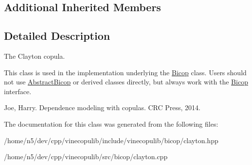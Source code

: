 \subsection*{Additional Inherited Members}


\subsection{Detailed Description}
The Clayton copula. 

This class is used in the implementation underlying the \hyperlink{classvinecopulib_1_1_bicop}{Bicop} class. Users should not use \hyperlink{classvinecopulib_1_1_abstract_bicop}{Abstract\+Bicop} or derived classes directly, but always work with the \hyperlink{classvinecopulib_1_1_bicop}{Bicop} interface.

Joe, Harry. Dependence modeling with copulas. C\+RC Press, 2014. 

The documentation for this class was generated from the following files\+:\begin{DoxyCompactItemize}
\item 
/home/n5/dev/cpp/vinecopulib/include/vinecopulib/bicop/clayton.\+hpp\item 
/home/n5/dev/cpp/vinecopulib/src/bicop/clayton.\+cpp\end{DoxyCompactItemize}
